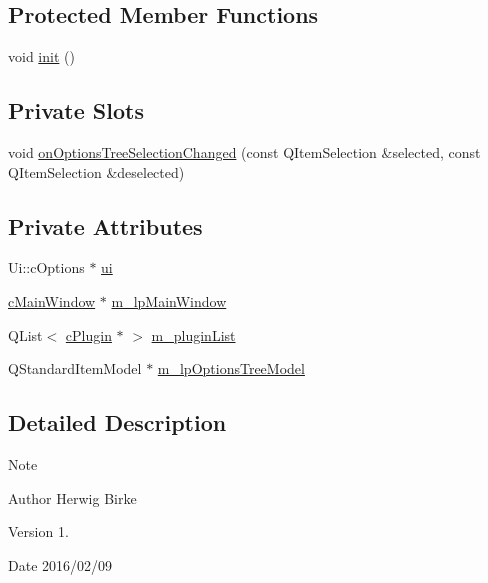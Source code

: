 \subsection*{Protected Member Functions}
\begin{DoxyCompactItemize}
\item 
void \hyperlink{classc_options_a2b71f5c334967a6eb3ec85cc20162cf9}{init} ()
\end{DoxyCompactItemize}
\subsection*{Private Slots}
\begin{DoxyCompactItemize}
\item 
void \hyperlink{classc_options_ac38dce7a12374ec291023a724c8d30ac}{on\+Options\+Tree\+Selection\+Changed} (const Q\+Item\+Selection \&selected, const Q\+Item\+Selection \&deselected)
\end{DoxyCompactItemize}
\subsection*{Private Attributes}
\begin{DoxyCompactItemize}
\item 
Ui\+::c\+Options $\ast$ \hyperlink{classc_options_a60bdd139c27b5a5e77c018ff41880995}{ui}
\item 
\hyperlink{classc_main_window}{c\+Main\+Window} $\ast$ \hyperlink{classc_options_a19b1ed8dd34f5fcde6dd4ac6167f3b42}{m\+\_\+lp\+Main\+Window}
\item 
Q\+List$<$ \hyperlink{classc_plugin}{c\+Plugin} $\ast$ $>$ \hyperlink{classc_options_a9891a847c04b7581120a51989ff73328}{m\+\_\+plugin\+List}
\item 
Q\+Standard\+Item\+Model $\ast$ \hyperlink{classc_options_a6f83c5dacdeb7901b900b826640a5f1d}{m\+\_\+lp\+Options\+Tree\+Model}
\end{DoxyCompactItemize}


\subsection{Detailed Description}
\begin{DoxyNote}{Note}

\end{DoxyNote}
\begin{DoxyAuthor}{Author}
Herwig Birke
\end{DoxyAuthor}
\begin{DoxyVersion}{Version}
1.
\end{DoxyVersion}
\begin{DoxyDate}{Date}
2016/02/09 
\end{DoxyDate}


